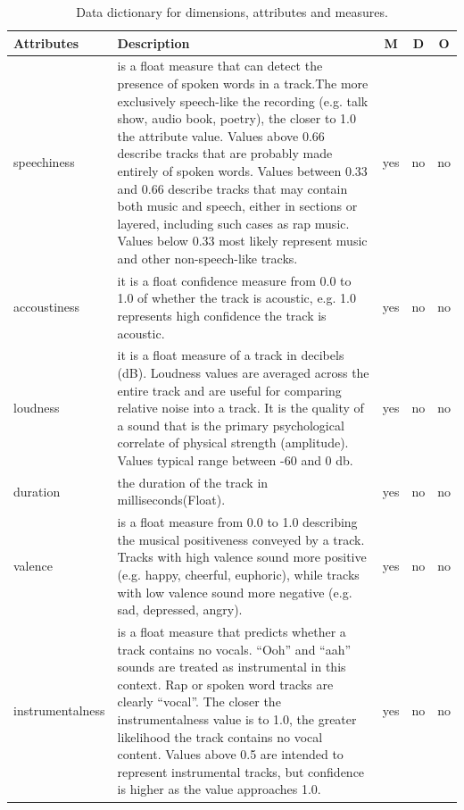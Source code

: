 \documentclass[12pt]{article}
\begin{document}
\begin{table}[h!]
\begin{center}
\begin{tabular}{@{}|l|p{9cm}|c|c|c|@{}} 
\toprule
Attributes & Description & M & D & O \\ [0.5ex] \midrule
speechiness & is a float measure that can detect the presence of spoken words in a track.The more exclusively speech-like the recording (e.g. talk show, audio book, poetry), the closer to 1.0 the attribute value. Values above 0.66 describe tracks that are probably made entirely of spoken words. Values between 0.33 and 0.66 describe tracks that may contain both music and speech, either in sections or layered, including such cases as rap music. Values below 0.33 most likely represent music and other non-speech-like tracks. & yes & no & no \\ \hline
accoustiness & it is a float confidence measure from 0.0 to 1.0 of whether the track is acoustic, e.g. 1.0 represents high confidence the track is acoustic. & yes & no & no \\ \hline
loudness & it is a float measure of a track in decibels (dB). Loudness values are averaged across the entire track and are useful for comparing relative noise into a track. It is the quality of a sound that is the primary psychological correlate of physical strength (amplitude). Values typical range between -60 and 0 db.  & yes & no & no \\ \hline
duration & the duration of the track in milliseconds(Float). & yes & no & no \\ \hline
valence & is a float measure from 0.0 to 1.0 describing the musical positiveness conveyed by a track. Tracks with high valence sound more positive (e.g. happy, cheerful, euphoric), while tracks with low valence sound more negative (e.g. sad, depressed, angry).  & yes & no & no \\ \hline
instrumentalness & is a float measure that predicts whether a track contains no vocals. “Ooh” and “aah” sounds are treated as instrumental in this context. Rap or spoken word tracks are clearly “vocal”. The closer the instrumentalness value is to 1.0, the greater likelihood the track contains no vocal content. Values above 0.5 are intended to represent instrumental tracks, but confidence is higher as the value approaches 1.0. & yes & no & no \\ \bottomrule \midrule
\end{tabular}
\caption{Data dictionary for dimensions, attributes and measures.}
\label{table:2}
\end{center}
\end{table}
\end{document}
